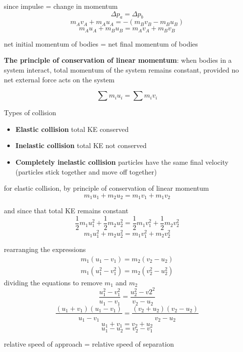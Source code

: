 \documentclass[a4paper, 10pt]{article}
\begin{document}
since impulse = change in momentum
\[
  \Delta p_a = \Delta p_b
\]
\[
   m_A v_A + m_A u_A = -(m_B v_B - m_B u_B)
\]
\[
   m_A u_A + m_B u_B = m_A v_A + m_B v_B
\]

\begin{center}
   net initial momentum of bodies = net final momentum of bodies
\end{center}	

\begin{framed}
  \textbf{The principle of conservation of linear momentum}: when bodies in a system interact, total momentum of the system remains constant, provided no net external force acts on the system   

  \[
  \sum m_i u_i = \sum m_i v_i
  \]
  
\end{framed}	

Types of collision
\begin{itemize}
   \item \textbf{Elastic collision} total KE conserved
   \item \textbf{Inelastic collision} total KE not conserved
   \item \textbf{Completely inelastic collision} particles have the same final velocity (particles stick together and move off together)
\end{itemize}	

for elastic collision, by principle of conservation of linear momentum
\[
m_1 u_1 + m_2 u_2 = m_1 v_1 + m_1 v_2
\]

and since that total KE remains constant
\[
   \frac{1}{2} m_1 u_1^2 + \frac{1}{2} m_2 u_2^2 =
   \frac{1}{2} m_1 v_1^2 + \frac{1}{2} m_2 v_2^2
\]
\[
   m_1 u_1^2 + m_2 u_2^2 =
   m_1 v_1^2 + m_2 v_2^2
\]

rearranging the expressions
\begin{align*}
   m_1 (u_1 - v_1) = m_2 (v_2 - u_2) \\
   m_1 (u_1^2 - v_1^2) = m_2(v_2^2 - u^2_2)
\end{align*}	
dividing the equations to remove $m_1$ and $m_2$ 
\[
 \frac{u_1^2 - v_1^2}{u_1 - v_1} = \frac{u_2^2- v2^2}{v_2 - u_2}
\]
\[
   \frac{(u_1+v_1)(u_1 -v_1)}{u_1 - v_1} = \frac{(v_2+u_2)(v_2 - u_2)}{v_2 - u_2}
\]
\[
u_1 + v_1 = v_2 + u_2
\]
\[
u_1 - u_2 = v_2 - v_1
\]
\begin{center}
   relative speed of approach = relative speed of separation
\end{center}	
\end{document}
